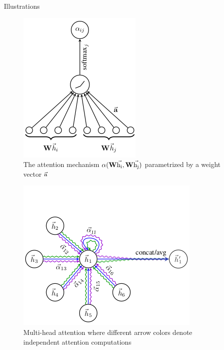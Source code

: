 \documentclass{beamer}
\theoremstyle{definition}
\begin{document}
\begin{frame}{Illustrations}
    \begin{multicols}{2}
        \begin{figure}
            \centering
            \includegraphics[scale=0.4]{GAT1.png}
            \caption{The attention mechanism \(\alpha(\textbf{W}\vec{\rm h_{i}},\textbf{W}\vec{\rm h_{j}})\) parametrized by a weight vector \(\vec{\rm a}\)}
        \end{figure}
        \begin{figure}
            \centering
            \includegraphics[scale=0.40]{GAT2.png}
            \caption{Multi-head attention where different arrow colors denote independent attention computations}
        \end{figure}
    \end{multicols}
\end{frame}
\end{document}
